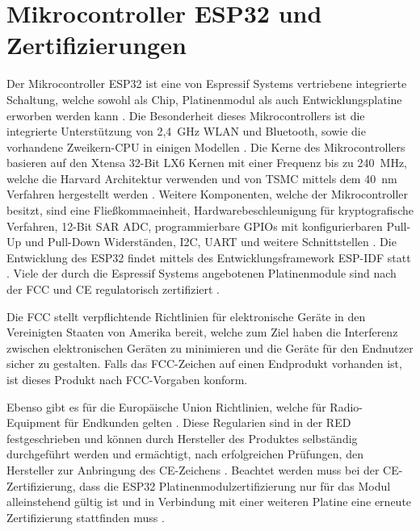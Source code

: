 \section{Mikrocontroller ESP32 und Zertifizierungen}
\label{section:esp32Explained}

Der Mikrocontroller ESP32 ist eine von Espressif Systems vertriebene integrierte Schaltung, welche sowohl als Chip, Platinenmodul als auch Entwicklungsplatine erworben werden kann \cites{espressifModules}{espressifDevKit}{espressifSoC}. Die Besonderheit dieses Mikrocontrollers ist die integrierte Unterstützung von 2,4~GHz \acs{WLAN} und Bluetooth, sowie die vorhandene Zweikern-\acs{CPU} in einigen Modellen \cites{espressifGetStarted}[S.~8]{espressifTechnicalReference}[S.~24]{espressifTechnicalReference}. Die Kerne des Mikrocontrollers basieren auf den Xtensa 32-Bit LX6 Kernen mit einer Frequenz bis zu 240~MHz, welche die Harvard Architektur verwenden und von TSMC mittels dem 40~nm Verfahren hergestellt werden \cites{espressifGetStarted}[S.~9]{espressifTechnicalReference}[S.~8]{espressifTechnicalReference}[S.~24]{espressifTechnicalReference}. Weitere Komponenten, welche der Mikrocontroller besitzt, sind eine Fließkommaeinheit, Hardwarebeschleunigung für kryptografische Verfahren, 12-Bit \ac{SAR} \ac{ADC}, programmierbare \acfp{GPIO} mit konfigurierbaren Pull-Up und Pull-Down Widerständen, \ac{I2C}, \ac{UART} und weitere Schnittstellen \cites[S.~10f.]{espressifTechnicalReference}[S.~23]{espressifTechnicalReference}[S.~34]{espressifTechnicalReference}. Die Entwicklung des ESP32 findet mittels des Entwicklungsframework \ac{ESP-IDF} statt \cites{espressifGetStarted}{espressifIDF}. Viele der durch die Espressif Systems angebotenen Platinenmodule sind nach der \ac{FCC} \cite{fccApproval} und \ac{CE} regulatorisch zertifiziert \cite{espressifCertificates}.

Die \ac{FCC} stellt verpflichtende Richtlinien für elektronische Geräte in den Vereinigten Staaten von Amerika bereit, welche zum Ziel haben die Interferenz zwischen elektronischen Geräten zu minimieren und die Geräte für den Endnutzer sicher zu gestalten. Falls das \ac{FCC}-Zeichen auf einen Endprodukt vorhanden ist, ist dieses Produkt nach \ac{FCC}-Vorgaben konform. \cite{fccApproval}

Ebenso gibt es für die Europäische Union Richtlinien, welche für Radio-Equipment für Endkunden gelten \cites{europeanCEMarking}{europeanRED}. Diese Regularien sind in der \ac{RED} festgeschrieben und können durch Hersteller des Produktes selbständig durchgeführt werden und ermächtigt, nach erfolgreichen Prüfungen, den Hersteller zur Anbringung des \ac{CE}-Zeichens \cite[S.~14]{europeanFunkanalagen}. Beachtet werden muss bei der \ac{CE}-Zertifizierung, dass die ESP32 Platinenmodulzertifizierung nur für das Modul alleinstehend gültig ist und in Verbindung mit einer weiteren Platine eine erneute Zertifizierung stattfinden muss \cite{naumannCE}.

